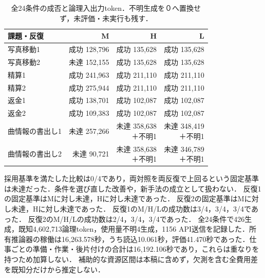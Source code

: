 \begin{table}[tb]
\centering\footnotesize\setlength{\tabcolsep}{2pt}
\caption{全24条件の成否と論理入出力token．不明生成を０へ置換せず，未評価・未実行も残す．}
\begin{tabular}{lrrr}
課題・反復 & M & H & L \\ \hline
写真移動1 & 成功 128,796 & 成功 135,628 & 成功 135,628 \\
写真移動2 & 未達 152,155 & 成功 135,628 & 成功 135,628 \\
精算1 & 成功 241,963 & 成功 211,110 & 成功 211,110 \\
精算2 & 成功 275,944 & 成功 211,110 & 成功 211,110 \\
返金1 & 成功 138,701 & 成功 102,087 & 成功 102,087 \\
返金2 & 成功 109,383 & 成功 102,087 & 成功 102,087 \\
曲情報の書出し1 & 未達 257,266 & \shortstack[r]{未達 358,638\\＋不明1} & \shortstack[r]{未達 348,419\\＋不明1} \\
曲情報の書出し2 & 未達 90,721 & \shortstack[r]{未達 358,638\\＋不明1} & \shortstack[r]{未達 346,789\\＋不明1} \\
\hline\end{tabular}

\end{table}
採用基準を満たした比較は0/4であり，両対照を両反復で上回るという固定基準は未達だった．条件を選び直した改善や，新手法の成立として扱わない．
反復1の固定基準はMに対し未達，Hに対し未達であった．
反復2の固定基準はMに対し未達，Hに対し未達であった．
反復1のM/H/Lの成功数は3/4，3/4，3/4であった．
反復2のM/H/Lの成功数は2/4，3/4，3/4であった．
全24条件で426生成，既知4,602,713論理token，使用量不明4生成，1156 API送信を記録した．所有推論器の稼働は16,263.578秒，うち読込10.061秒，評価41.470秒であった．仕事ごとの準備・作業・後片付けの合計は16,192.106秒であり，これらは重なりを持つため加算しない．
補助的な資源区間は本稿に含めず，欠測を含む全費用差を既知分だけから推定しない．
